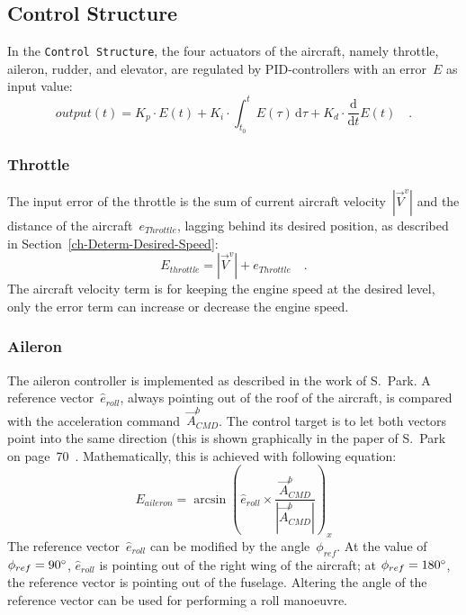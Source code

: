 \documentclass[11pt,a4paper]{scrartcl}		%
\begin{document}
\medskip





\subsection{Control Structure}

In the \texttt{Control Structure}, the four actuators of the aircraft, namely throttle, aileron, rudder, and elevator, are regulated by PID-controllers with an error~$E$ as input value:
\begin{equation}
output(t) = K_p \cdot E(t) + K_i \cdot \int_{t_0}^t E(\tau)\, \mathrm{d}\tau + K_d \cdot \frac{\mathrm{d}}{\mathrm{d}t}E(t)\quad .
\end{equation}

\subsubsection*{Throttle}
The input error of the throttle is the sum of current aircraft velocity~$|\vec{V}^v|$ and the distance of the aircraft~$e_{Throttle}$, lagging behind its desired position, as described in Section~\ref{ch-Determ-Desired-Speed}:
\begin{equation}
E_{throttle} = |\vec{V}^v| + e_{Throttle} \quad .
\end{equation} 
The aircraft velocity term is for keeping the engine speed at the desired level, only the error term can increase or decrease the engine speed.

\subsubsection*{Aileron}
The aileron controller is implemented as described in the work of S.~Park\cite[p.~71]{Park.2012}.
A reference vector~$\hat{e}_{roll}$, always pointing out of the roof of the aircraft, is compared with the acceleration command~$\vec{A}_{CMD}^b$. 
The control target is to let both vectors point into the same direction (this is shown graphically in the paper of S.~Park on page~70~\cite{Park.2012}.
Mathematically, this is achieved with following equation:
\begin{equation}
E_{aileron}=\arcsin\left(\hat{e}_{roll} \times \frac{\vec{A}_{CMD}^b}{|\vec{A}_{CMD}^b|}\right)_x
\end{equation}
The reference vector~$\hat{e}_{roll}$ can be modified by the angle~$\phi_{ref}$. At the value of $\phi_{ref}=90\degree$, $\hat{e}_{roll}$ is pointing out of the right wing of the aircraft; at $\phi_{ref}=180\degree$, the reference vector is pointing out of the fuselage.
Altering the angle of the reference vector can be used for performing a roll manoeuvre.
\end{document}
